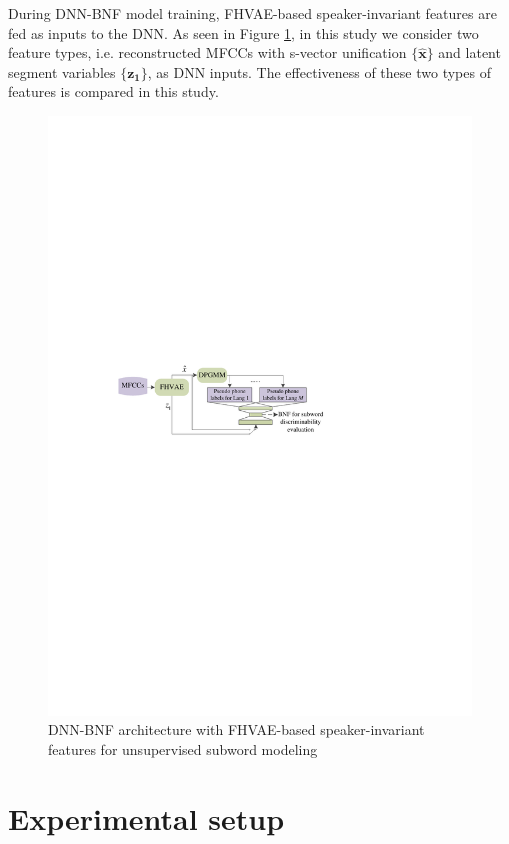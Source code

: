 \documentclass[a4paper]{article}
\begin{document}
During  DNN-BNF model training,  FHVAE-based speaker-invariant features are  fed as  inputs to the DNN. As seen in Figure \ref{fig:framework}, in this study we consider two feature types, i.e.  reconstructed MFCCs with s-vector unification $\{\bm{\hat{x}}\}$  and latent segment variables $\{\bm{z_1}\}$, as DNN inputs. The effectiveness of these two types of features  is compared in this study.  
\begin{figure}[t]
    \centering
    \includegraphics[width=0.87\linewidth]{framework.pdf}
    \caption{DNN-BNF architecture with FHVAE-based speaker-invariant features for unsupervised subword  modeling}
    \label{fig:framework}
\end{figure}
\section{Experimental setup}
\end{document}
